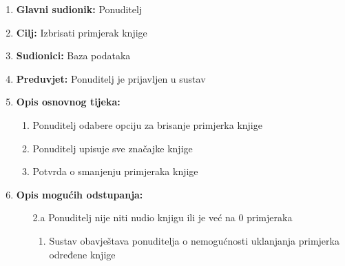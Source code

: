 \noindent {}
\begin{enumerate}
	
	\item \textbf{Glavni sudionik: } Ponuditelj
	\item  \textbf{Cilj:} Izbrisati primjerak knjige
	\item  \textbf{Sudionici:} Baza podataka
	\item  \textbf{Preduvjet:} Ponuditelj je prijavljen u sustav
	\item  \textbf{Opis osnovnog tijeka:}
	
	\begin{enumerate}
		
		\item Ponuditelj odabere opciju za brisanje primjerka knjige
		\item Ponuditelj upisuje sve značajke knjige 
		\item Potvrda o smanjenju primjeraka knjige 
		
	\end{enumerate}
	
	\item  \textbf{Opis mogućih odstupanja:}
	
	\item[] \begin{enumerate}
		
		\item[2.a] Ponuditelj nije niti nudio knjigu ili je već na 0 primjeraka 
		\item[] \begin{enumerate}
			
			\item Sustav obavještava ponuditelja o nemogućnosti uklanjanja primjerka određene knjige
			
		\end{enumerate}
		
	\end{enumerate}
	
\end{enumerate}


